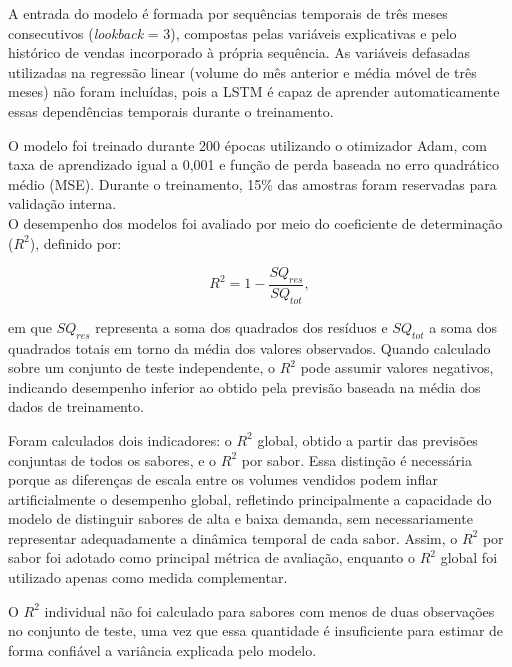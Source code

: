 A entrada do modelo é formada por sequências temporais de três meses consecutivos (\textit{lookback} = 3), compostas pelas variáveis explicativas e pelo histórico de vendas incorporado à própria sequência. As variáveis defasadas utilizadas na regressão linear (volume do mês anterior e média móvel de três meses) não foram incluídas, pois a LSTM é capaz de aprender automaticamente essas dependências temporais durante o treinamento. 

O modelo foi treinado durante 200 épocas utilizando o otimizador Adam, com taxa de aprendizado igual a 0,001 e função de perda baseada no erro quadrático médio (MSE). Durante o treinamento, 15\% das amostras foram reservadas para validação interna. \\

O desempenho dos modelos foi avaliado por meio do coeficiente de determinação ($R^2$), definido por:

\[R^2 = 1 - \frac{SQ_{res}}{SQ_{tot}},\]

em que $SQ_{res}$ representa a soma dos quadrados dos resíduos e $SQ_{tot}$ a soma dos quadrados totais em torno da média dos valores observados. Quando calculado sobre um conjunto de teste independente, o $R^2$ pode assumir valores negativos, indicando desempenho inferior ao obtido pela previsão baseada na média dos dados de treinamento.

Foram calculados dois indicadores: o $R^2$ global, obtido a partir das previsões conjuntas de todos os sabores, e o $R^2$ por sabor. Essa distinção é necessária porque as diferenças de escala entre os volumes vendidos podem inflar artificialmente o desempenho global, refletindo principalmente a capacidade do modelo de distinguir sabores de alta e baixa demanda, sem necessariamente representar adequadamente a dinâmica temporal de cada sabor. Assim, o $R^2$ por sabor foi adotado como principal métrica de avaliação, enquanto o $R^2$ global foi utilizado apenas como medida complementar.

O $R^2$ individual não foi calculado para sabores com menos de duas observações no conjunto de teste, uma vez que essa quantidade é insuficiente para estimar de forma confiável a variância explicada pelo modelo.
